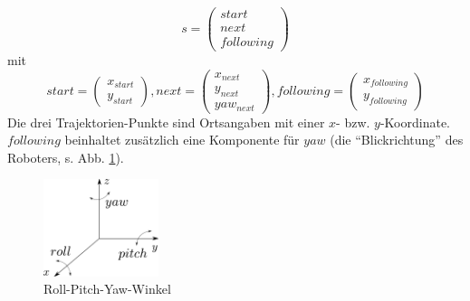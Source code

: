 % 

\begin{equation}
	s =	\begin{pmatrix} start \\ next \\ following \end{pmatrix}
\end{equation}
mit 
\begin{equation}
	start = 		\begin{pmatrix}	x_{start} \\ y_{start}							\end{pmatrix},
	next = 			\begin{pmatrix} x_{next} \\ y_{next} \\ yaw_{next}	\end{pmatrix},
	following =	\begin{pmatrix}	x_{following} \\ y_{following}							\end{pmatrix}
\end{equation}
Die drei Trajektorien-Punkte sind Ortsangaben mit einer $x$- bzw. $y$-Koordinate.
$following$ beinhaltet zusätzlich eine Komponente für $yaw$ (die ``Blickrichtung'' des Roboters, s. Abb. \ref{fig:roll_pitch_yaw}).

\begin{figure}	%
	\center
	\includegraphics[width=0.3\textwidth]{graphics/roll_pitch_yaw.pdf}
	\caption{Roll-Pitch-Yaw-Winkel \cite{rollPitchYaw}}
	\label{fig:roll_pitch_yaw}
\end{figure}	%

